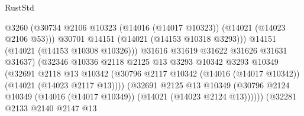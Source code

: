\begin{lexlean}{RustStd}
\begin{coremodule}
                                              @3260
                                              (@30734
                                                @2106
                                                @10323
                                                (@14016 (@14017 @10323))
                                                (@14021 (@14023 @2106 @53)))
                                              @30701
                                              @14151
                                              (@14021 (@14153 @10318 @3293)))
                                            @14151
                                            (@14021 (@14153 @10308 @10326)))
                                          @31616
                                          @31619
                                          @31622
                                          @31626
                                          @31631
                                          @31637)
                                        (@32346
                                          @10336
                                          @2118
                                          @2125
                                          @13
                                          @3293
                                          @10342
                                          @3293
                                          @10349
                                          (@32691
                                            @2118
                                            @13
                                            @10342
                                            (@30796
                                              @2117
                                              @10342
                                              (@14016 (@14017 @10342))
                                              (@14021 (@14023 @2117 @13))))
                                          (@32691
                                            @2125
                                            @13
                                            @10349
                                            (@30796
                                              @2124
                                              @10349
                                              (@14016 (@14017 @10349))
                                              (@14021 (@14023 @2124 @13))))))
                                      (@32281
                                        @2133
                                        @2140
                                        @2147
                                        @13

\end{coremodule}
\end{lexlean}

